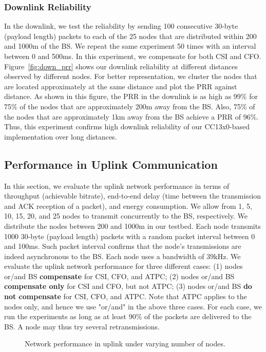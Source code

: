 \subsubsection{Downlink Reliability}
In the downlink, we test the reliability by sending 100 consecutive 30-byte (payload length) packets to each of the 25 nodes that are distributed within 200 and 1000m of the BS. We repeat the same experiment 50 times with an interval between 0 and 500ms. In this experiment, we compensate for both CSI and CFO.
Figure~\ref{fig:down_prr} shows our downlink reliability at different distances observed by different nodes. For better representation, we cluster the nodes that are located approximately at the same distance and plot the PRR against distance.
As shown in this figure, the PRR in the downlink is as high as 99\% for 75\% of the nodes that are approximately 200m away from the BS. Also, 75\% of the nodes that are approximately 1km away from the BS achieve a PRR of 96\%. Thus, this experiment confirms high downlink reliability of our CC13x0-based implementation over long distances.


\subsection{Performance in Uplink Communication}\label{sec:tputuplink}
 
In this section, we evaluate the uplink network performance in terms of throughput (achievable bitrate), end-to-end delay (time between the transmission and ACK reception of a packet), and energy consumption. We allow from 1, 5, 10, 15, 20, and 25 nodes to transmit concurrently to the BS, respectively. We distribute the nodes between 200 and 1000m in our testbed. Each node transmits 1000 30-byte (payload length) packets with a random packet interval between 0 and 100ms. 
Such packet interval confirms that the node's transmissions are indeed asynchronous to the BS.
Each node uses a bandwidth of 39kHz. 
We evaluate the uplink network performance for three different cases: (1) nodes or/and BS {\bf compensate} for CSI, CFO, and ATPC; (2) nodes or/and BS {\bf compensate only} for CSI and CFO, but not ATPC; (3) nodes or/and BS {\bf do not compensate} for CSI, CFO, and ATPC. Note that ATPC applies to the nodes only, and hence we use "or/and" in the above three cases.
For each case, we run the experiments as long as at least 90\% of the packets are delivered to the BS. A node may thus try several retransmissions.
\begin{figure*}[!htbp]
    \centering
      \hfill
      \hfill 
    \caption{Network performance in uplink under varying number of nodes.}
    \label{fig:performance}
 \end{figure*}

